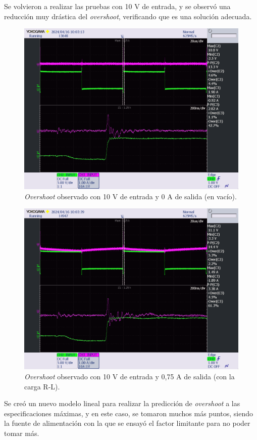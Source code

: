 Se volvieron a realizar las pruebas con 10 V de entrada, y se observó una reducción muy drástica del \textit{overshoot}, verificando que es una solución adecuada.

\begin{figure}[H]
	\centering
	\includegraphics[width=0.7\linewidth]{fig/overshootFinal1}
	\caption{\textit{Overshoot} observado con 10 V de entrada y 0 A de salida (en vacío).}
\end{figure}

\begin{figure}[H]
	\centering
	\includegraphics[width=0.7\linewidth]{fig/overshootFinal2}
	\caption{\textit{Overshoot} observado con 10 V de entrada y 0,75 A de salida (con la carga R-L).}
\end{figure}

Se creó un nuevo modelo lineal para realizar la predicción de \textit{overshoot} a las especificaciones máximas, y en este caso, se tomaron muchos más puntos, siendo la fuente de alimentación con la que se ensayó el factor limitante para no poder tomar más.

